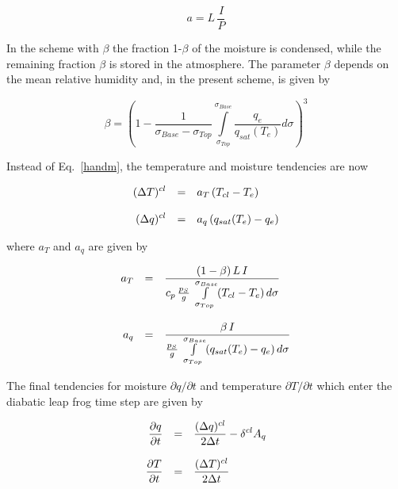 \begin{equation}
a=L\, \frac{I}{P}
\end{equation}


In the scheme with $\beta$ the fraction 1-$\beta$ of the
moisture is condensed, while the
remaining fraction  $\beta$ is stored in the atmosphere.
The  parameter $\beta$ depends on the
mean relative humidity and, in the present scheme, is
given by   

\begin{equation}
\beta = \left( 1 -
\frac{1}{\sigma_{Base}-\sigma_{Top}}
\int\limits_{\sigma_{Top}}^{\sigma_{Base}}
\frac{q_e}{q_{sat}(T_e)} d\sigma \right)^3
\end{equation}

Instead of Eq.~\ref{handm}, the temperature and
moisture tendencies are now

\begin{equation}\label{handm2}
\begin{array}{rcl}
\displaystyle (\Delta T)^{cl} & = & \displaystyle a_T \, (T_{cl} -T _e) \\
&&\\
\displaystyle (\Delta q)^{cl} & = & \displaystyle a_q \, (q_{sat}(T_e) -q
_e) 
\end{array}
\end{equation}

where $a_T$ and $a_q$ are given by  

\begin{equation}
\begin{array}{rcl}
\displaystyle a_T & = & \displaystyle \frac{(1-\beta )\, L\,  I }{c_p\,
\frac{p_S}{g}\,
\int\limits_{\sigma_{Top}}^{\sigma_{Base}} (T_{cl}
- T_e)\, d\sigma} \\
&&\\
\displaystyle a_q & = & \displaystyle \frac{\beta \, I }{\frac{p_S}{g}\,
\int\limits_{\sigma_{Top}}^{\sigma_{Base}}
(q_{sat}(T_e) - q_e) \, d\sigma} 
\end{array}
\end{equation}

The final tendencies for moisture $\partial q / \partial
t$ and temperature $\partial T / \partial t$
which enter the diabatic leap frog time step are given
by

\begin{equation}
\begin{array}{rcl}
\displaystyle \frac{\partial q}{\partial t} & = & \displaystyle \frac{(\Delta
q)^{cl}}{2 \Delta t} - {\delta}^{cl} A_q
\\
&& \\
\displaystyle \frac{\partial T}{\partial t} & = & \displaystyle \frac{(\Delta
T)^{cl}}{2 \Delta t} 
\end{array}
\end{equation}


